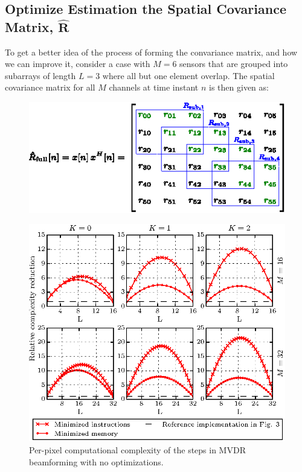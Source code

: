 \documentclass[12pt,journal,captionsoff,onecolumn]{IEEEtran}
\let\MYoriglatexcaption\caption               %
\renewcommand{\caption}[2][\relax]{\MYoriglatexcaption[#2]{#2}}
\newcommand\1{\vec 1}
\begin{document}
\subsection{Optimize Estimation the Spatial Covariance Matrix, $\hat{\boldsymbol{R}}$}

To get a better idea of the process of forming the convariance matrix, and how we can improve it,  consider a case with $M=6$ sensors that are grouped into subarrays of length $L=3$ where all but one element overlap. %
The spatial covariance matrix for all $M$ channels at time instant $n$ is then given as:
\begin{figure}[H]
\includegraphics[width=\linewidth]{gfx/capon_build_R_full.eps}
\end{figure}
\begin{figure}[!t]\centering
\includegraphics[width=\linewidth]{gfx/buildR-breakdown.eps}
\caption{Per-pixel computational complexity of the steps in MVDR beamforming with no optimizations.}
\label{implementation}
\end{figure}
\end{document}

